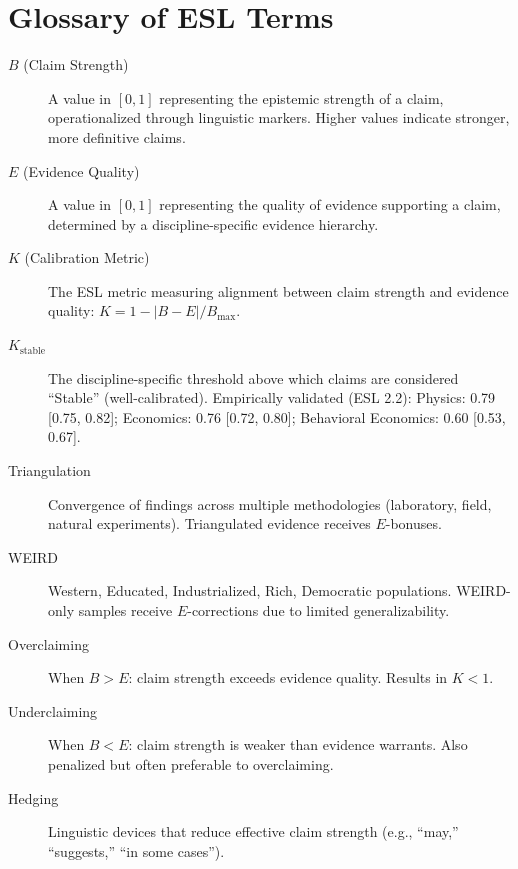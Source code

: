\documentclass[11pt,a4paper]{article}
\begin{document}

\section{Glossary of ESL Terms}
\label{app:glossary}

\begin{description}
    \item[$B$ (Claim Strength)] A value in $[0, 1]$ representing the epistemic strength of a claim, operationalized through linguistic markers. Higher values indicate stronger, more definitive claims.

    \item[$E$ (Evidence Quality)] A value in $[0, 1]$ representing the quality of evidence supporting a claim, determined by a discipline-specific evidence hierarchy.

    \item[$K$ (Calibration Metric)] The ESL metric measuring alignment between claim strength and evidence quality: $K = 1 - |B - E| / B_{\max}$.

    \item[$K_{\text{stable}}$] The discipline-specific threshold above which claims are considered ``Stable'' (well-calibrated). Empirically validated (ESL 2.2): Physics: 0.79 [0.75, 0.82]; Economics: 0.76 [0.72, 0.80]; Behavioral Economics: 0.60 [0.53, 0.67].

    \item[Triangulation] Convergence of findings across multiple methodologies (laboratory, field, natural experiments). Triangulated evidence receives $E$-bonuses.

    \item[WEIRD] Western, Educated, Industrialized, Rich, Democratic populations. WEIRD-only samples receive $E$-corrections due to limited generalizability.

    \item[Overclaiming] When $B > E$: claim strength exceeds evidence quality. Results in $K < 1$.

    \item[Underclaiming] When $B < E$: claim strength is weaker than evidence warrants. Also penalized but often preferable to overclaiming.

    \item[Hedging] Linguistic devices that reduce effective claim strength (e.g., ``may,'' ``suggests,'' ``in some cases'').


\end{description}
\end{document}
